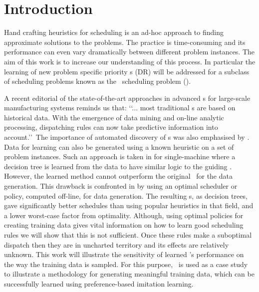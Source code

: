 \documentclass[twocolumn]{svjour3}
\begin{document}


\section{Introduction}\label{sec:introduction}

Hand crafting heuristics for scheduling is an ad-hoc approach to finding 
approximate solutions to the problems. The practice is time-consuming and its 
performance can even vary dramatically between different problem instances. The 
aim of this work is to increase our understanding of this process. In 
particular the learning of new problem specific priority \dr s (DR) will be 
addressed for a subclass of scheduling problems known as the \jsp\ scheduling 
problem (\JSP). 

A recent editorial of the state-of-the-art approaches \cite{Chen13} in advanced 
\dr s for large-scale manufacturing systems reminds us that:
\lq\lq ... most traditional \dr s are based on historical data. 
With the emergence of data mining and on-line analytic processing, dispatching 
rules can now take predictive information into account.\rq\rq~The importance of 
automated discovery of \dr s was also emphasised by \cite{Monch13}. 
Data for learning can also be generated using a known heuristic on a set of 
problem instances.
Such an approach is taken in \cite{Siggi05} for single-machine where
a decision tree is learned from the data to have similar logic to the guiding \dr.  
However, the learned method cannot outperform the original \dr\ for the data 
generation. 
This drawback is confronted in \cite{Malik08,Russell09,Siggi10} by using an 
optimal scheduler or policy, computed off-line, for data generation. The 
resulting \dr s, as decision trees, gave significantly better schedules than 
using popular 
heuristics in that field, and a lower worst-case factor from optimality. 
Although, using optimal policies for creating training data gives vital 
information on how to learn good scheduling rules we will show that this is 
not sufficient. Once these rules make a suboptimal dispatch then they are in 
uncharted territory and its effects are relatively unknown.  
This work will illustrate the sensitivity of learned \dr's performance on the 
way the training data is sampled.
For this purpose, \JSP\ is used as a case study to illustrate a methodology for 
generating meaningful training data, which can be successfully 
learned using preference-based imitation learning.
\end{document}
